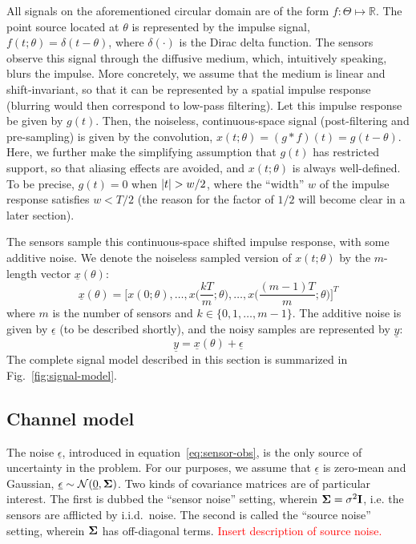 \documentclass[conference]{IEEEtran}
\providecommand{\v}{}
\renewcommand{\v}[1]{\underline{#1}}
\providecommand{\m}{}
\renewcommand{\m}[1]{{\bf #1}}
\DeclarePairedDelimiter\abs{\lvert}{\rvert}
\begin{document}
All signals on the aforementioned circular domain are of the form
$f:\Theta\mapsto\mathbb{R}$.  The point source located at $\theta$ is
represented by the impulse signal, $f(t;\theta) = \delta(t - \theta)$, where
$\delta(\cdot)$ is the Dirac delta function.  The sensors observe this signal
through the diffusive medium, which, intuitively speaking, blurs the impulse.
More concretely, we assume that the medium is linear and shift-invariant, so
that it can be represented by a spatial impulse response (blurring would then
correspond to low-pass filtering). Let this impulse response be given by
$g(t)$. Then, the noiseless, continuous-space signal (post-filtering and
pre-sampling) is given by the convolution, $x(t; \theta) = (g*f)(t) = g(t -
\theta)$. Here, we further make the simplifying assumption that $g(t)$ has
restricted support, so that aliasing effects are avoided, and $x(t; \theta)$ is
always well-defined. To be precise, $g(t) = 0$ when $\abs{t} > w/2$, where the
``width'' $w$ of the impulse response satisfies $w < T / 2$ (the reason for the
factor of $1/2$ will become clear in a later section).

The sensors sample this continuous-space shifted impulse response, with some
additive noise. We denote the noiseless sampled version of $x(t; \theta)$ by
the $m$-length vector $\v x(\theta)$:
\begin{equation} \label{eq:sampled-signal}
	\v x(\theta) = \bigg[x(0; \theta), \ldots, x\Big(\frac{kT}{m}; \theta\Big), \ldots, x\Big(\frac{(m-1)T}{m}; \theta\Big)\bigg]^T
\end{equation}
where $m$ is the number of sensors and $k \in \{0, 1, \ldots, m-1\}$. The
additive noise is given by $\v \epsilon$ (to be described shortly), and the
noisy samples are represented by $\v y$:
\begin{equation} \label{eq:sensor-obs}
	\v y = \v x(\theta) + \v \epsilon
\end{equation}
The complete signal model described in this section is summarized in
Fig.~\ref{fig:signal-model}.

\subsection{Channel model}
\label{sec:channel-model}

The noise $\v \epsilon$, introduced in equation~\eqref{eq:sensor-obs}, is
the only source of uncertainty in the problem. For our purposes, we assume that
$\v \epsilon$ is zero-mean and Gaussian, $\v \epsilon \sim \mathcal{N}(\v 0, \m
\Sigma)$. Two kinds of covariance matrices are of particular interest. The
first is dubbed the ``sensor noise'' setting, wherein $\m\Sigma = \sigma^2 \m
I$, i.e. the sensors are afflicted by i.i.d.\ noise. The second is called the
``source noise'' setting, wherein $\m\Sigma$ has off-diagonal terms.
\textcolor{red}{Insert description of source noise.}
\end{document}
